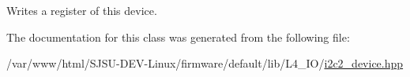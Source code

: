 Writes a register of this device. 



The documentation for this class was generated from the following file\+:\begin{DoxyCompactItemize}
\item 
/var/www/html/\+S\+J\+S\+U-\/\+D\+E\+V-\/\+Linux/firmware/default/lib/\+L4\+\_\+\+I\+O/\hyperlink{i2c2__device_8hpp}{i2c2\+\_\+device.\+hpp}\end{DoxyCompactItemize}
